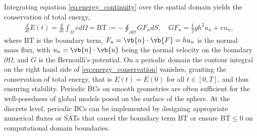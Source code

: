 \documentclass{article}
\numberwithin{equation}{section}
\theoremstyle{definition}
\begin{document}
Integrating equation \eqref{eq:energy_continuity} over the spatial domain yields the conservation of total energy,
\begin{align}\label{eq:energy_conservation}
 \frac{d}{dt}E(t)= \frac{d}{dt}\int_{\Omega} e d\Omega =\mathrm{BT}:= -\oint_{\partial \Omega} G F_n dS, \quad G F_n = \frac{1}{2}gh^2u_n + eu_n,
\end{align}
where $\mathrm{BT}$ is the boundary term, $F_n = \vb{n}\cdot \vb{F} = hu_n$   is the normal mass flux, with $u_n=\vb{n}\cdot \vb{u}$ being the normal velocity on the boundary $\partial \Omega$, and $G$ is the Bernoulli's potential. On a periodic domain the contour integral on the right hand side of \eqref{eq:energy_conservation} vanishes, granting the conservation of total energy, that is $E(t)=E(0)$ for all $t \in [0,T]$, and thus ensuring stability. Periodic BCs on smooth geometries  are often sufficient for the well-posedness of global models posed on the surface of the sphere. At the discrete level, periodic BCs can be implemented by designing appropriate numerical fluxes or SATs that cancel the boundary term $\mathrm{BT}$ or ensure $\mathrm{BT} \le 0$ on computational domain boundaries. 
\end{document}
